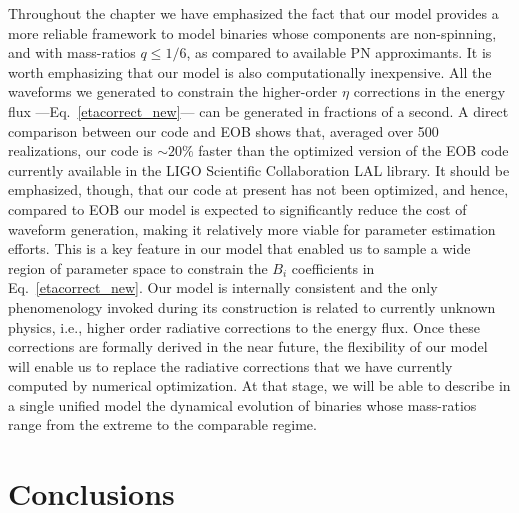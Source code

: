 Throughout the chapter we have emphasized the fact that our model provides a more reliable framework to model binaries whose components are non-spinning, and with mass-ratios \(q\leq 1/6\), as compared to available PN approximants. It is worth emphasizing that our model is also computationally inexpensive. All the waveforms we generated to constrain the higher-order \(\eta\) corrections in the energy flux ---Eq.~\eqref{etacorrect_new}--- can be generated in fractions of a second. A direct comparison between our code and EOB shows that, averaged over 500 realizations, our code is \(\sim20\%\) faster than the optimized version of the EOB code currently available in the LIGO Scientific Collaboration LAL library. It should be emphasized, though, that our code at present has not been optimized, and hence, compared to EOB our model is expected to significantly reduce the cost of waveform generation, making it relatively more viable for parameter estimation efforts. This is a key feature in our model that enabled 
us to sample a wide region of parameter space to constrain the \(B_i\) coefficients in Eq.~\eqref{etacorrect_new}. 
Our model is internally consistent and the only phenomenology invoked during its construction is related to currently unknown physics, i.e., higher order radiative corrections to the energy flux. Once these corrections are formally derived in the near future, the flexibility of our model will enable us to replace the radiative corrections that we have currently computed by numerical optimization.  At that stage, we 
will be able to describe in a single unified model the dynamical evolution of binaries whose mass-ratios range from the extreme to the comparable regime. 

\section{Conclusions}
\label{conclu}

